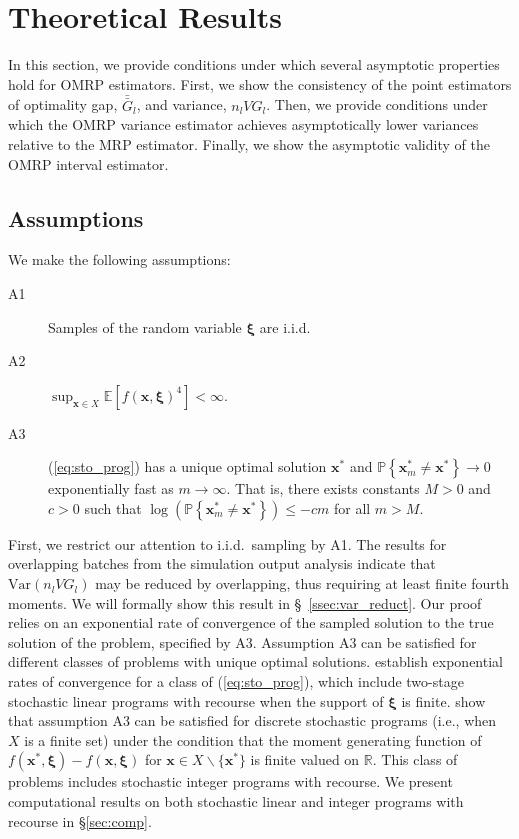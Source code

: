 \documentclass[12pt]{article}
\newcommand{\R}{{\mathbb{R}}}
\newcommand{\p}[1]{\mathbb{P} \left\{ #1 \right\}}
\newcommand{\e}[1]{\mathbb{E} \left[ #1 \right]
}
\newcommand{\var}[1]{\mathrm{Var} \left( #1 \right)}
\newcommand{\x}{\mathbf{x}}
\newcommand{\xs}{\x^*}
\newcommand{\xit}{\boldsymbol{\xi}}
\newcommand{\gb}{\bar{G}}
\newcommand{\gbb}{\bar{\gb}}
\begin{document}
\section{Theoretical Results} 
\label{sec:theory}

In this section, we provide conditions under which several asymptotic properties hold for OMRP estimators. 
First, we show the consistency of the point estimators of optimality gap, $\gbb_l$, and variance, $n_l VG_l$. 
Then, we provide conditions under which the OMRP variance estimator achieves asymptotically lower variances relative to the MRP estimator.  
Finally, we show the asymptotic validity of the OMRP interval estimator. 

\subsection{Assumptions}
\label{subsec:assumptions}

We make the following assumptions:

\begin{description}
	\item[A1] Samples of the random variable $\xit$ are i.i.d.
	\item[A2] $\sup_{\x \in X} \e{f(\x,\xit)^{4}} < \infty$.
	\item[A3] (\ref{eq:sto_prog}) has a unique optimal solution $\xs$ and $\p{\xs_m \neq \xs} \rightarrow 0$ exponentially fast as $m \rightarrow \infty$.  
           That is, there exists constants $M > 0$ and $c > 0$ such that $\log(\p{\xs_m \neq \xs}) \leq -cm$ for all $m > M$.
\end{description}

First, we restrict our attention to i.i.d.\ sampling by A1.
The results for overlapping batches from the simulation output analysis indicate that $\var{n_l VG_l}$ may be reduced by overlapping, thus requiring at least finite fourth moments. 
We will formally show this result in \S~\ref{ssec:var_reduct}.
Our proof relies on an exponential rate of convergence of the sampled solution to the true solution of the problem, specified by A3.  
Assumption A3 can be satisfied for different classes of problems with unique optimal solutions.  
\citet{shapiro2000rate} establish exponential rates of convergence for a class of (\ref{eq:sto_prog}), which include two-stage stochastic linear programs with recourse when the support of $\xit$ is finite.   
\citet{kleywegt2002sample} show that assumption A3 can be satisfied for discrete stochastic programs (i.e., when $X$ is a finite set) under the condition that the moment generating function of $f(\xs,\xit) - f(\x,\xit)$ for $\x \in X \backslash \{\xs\}$ is finite valued on $\R$.  
This class of problems includes stochastic integer programs with recourse.
  We present computational results on both stochastic linear and integer programs with recourse in \S \ref{sec:comp}.
\end{document}
